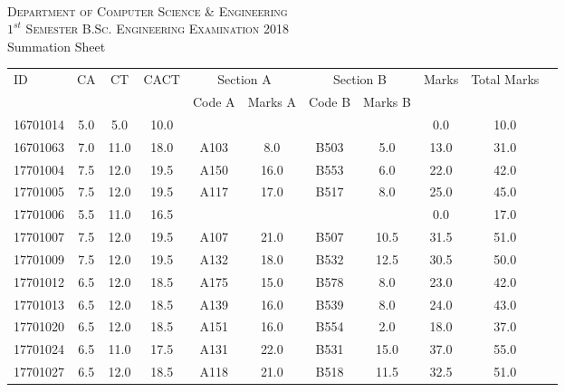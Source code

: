 \documentclass[12pt]{article}
\begin{document}
    \centering
    \begin{minipage}[m]{.8\textwidth} \centering 
	\smallskip
	\\
	\textsc{Department of Computer Science \& Engineering}\\
	\textsc{$1^{st}$ Semester B.Sc. Engineering Examination 2018}\\
	{\large {\sc Summation Sheet}}\\  
    \end{minipage} 
    \begin{center} 
	\renewcommand{\arraystretch}{1.08}
	\begin{small}
    \begin{tabular}{|l|c|c|c|c|c|c|c|c|c|c|} \hline
	\multirow{2}{*}{ID} & 	\multirow{2}{*}{CA}  & 	\multirow{2}{*}{CT}  & 	\multirow{2}{*}{CACT}  & \multicolumn{2 }{|c|}{Section A}& \multicolumn{2 }{c|}{Section B} & 	\multirow{2}{*}{Marks}  & 	\multirow{2}{*}{Total Marks}  \\ 
	&  &  &  & Code A & Marks A & Code B & Marks B&  &  \\ \hline
16701014 & 5.0 & 5.0 & 10.0 &  &  &  &  & 0.0 & 10.0\\ \hline 
16701063 & 7.0 & 11.0 & 18.0 & A103 & 8.0 & B503 & 5.0 & 13.0 & 31.0\\ \hline 
17701004 & 7.5 & 12.0 & 19.5 & A150 & 16.0 & B553 & 6.0 & 22.0 & 42.0\\ \hline 
17701005 & 7.5 & 12.0 & 19.5 & A117 & 17.0 & B517 & 8.0 & 25.0 & 45.0\\ \hline 
17701006 & 5.5 & 11.0 & 16.5 &  &  &  &  & 0.0 & 17.0\\ \hline 
17701007 & 7.5 & 12.0 & 19.5 & A107 & 21.0 & B507 & 10.5 & 31.5 & 51.0\\ \hline 
17701009 & 7.5 & 12.0 & 19.5 & A132 & 18.0 & B532 & 12.5 & 30.5 & 50.0\\ \hline 
17701012 & 6.5 & 12.0 & 18.5 & A175 & 15.0 & B578 & 8.0 & 23.0 & 42.0\\ \hline 
17701013 & 6.5 & 12.0 & 18.5 & A139 & 16.0 & B539 & 8.0 & 24.0 & 43.0\\ \hline 
17701020 & 6.5 & 12.0 & 18.5 & A151 & 16.0 & B554 & 2.0 & 18.0 & 37.0\\ \hline 
17701024 & 6.5 & 11.0 & 17.5 & A131 & 22.0 & B531 & 15.0 & 37.0 & 55.0\\ \hline 
17701027 & 6.5 & 12.0 & 18.5 & A118 & 21.0 & B518 & 11.5 & 32.5 & 51.0\\ \hline 

\end{tabular}
\end{small}
\end{center}
\end{document}
